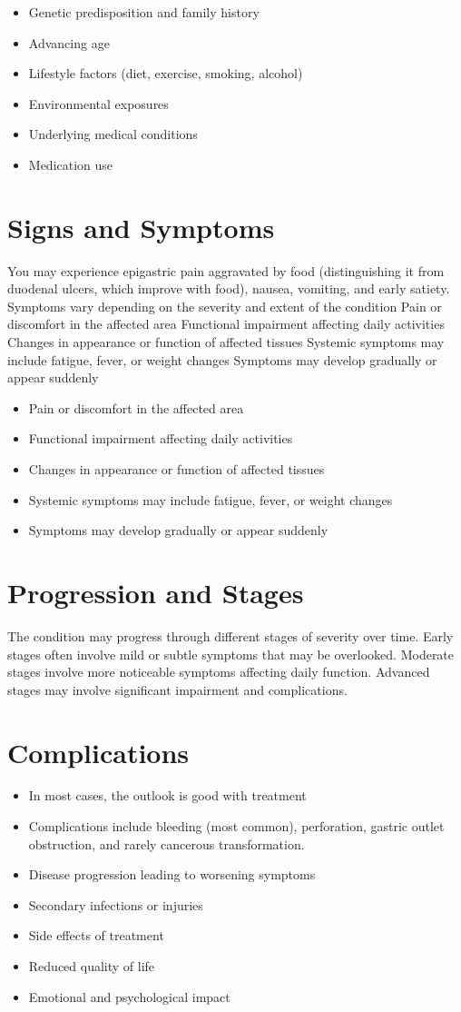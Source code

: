 \begin{itemize}[noitemsep]
  \item Genetic predisposition and family history
  \item Advancing age
  \item Lifestyle factors (diet, exercise, smoking, alcohol)
  \item Environmental exposures
  \item Underlying medical conditions
  \item Medication use
\end{itemize}
\section{Signs and Symptoms}
You may experience epigastric pain aggravated by food (distinguishing it from duodenal ulcers, which improve with food), nausea, vomiting, and early satiety. Symptoms vary depending on the severity and extent of the condition Pain or discomfort in the affected area Functional impairment affecting daily activities Changes in appearance or function of affected tissues Systemic symptoms may include fatigue, fever, or weight changes Symptoms may develop gradually or appear suddenly

\begin{itemize}[noitemsep]
  \item Pain or discomfort in the affected area
  \item Functional impairment affecting daily activities
  \item Changes in appearance or function of affected tissues
  \item Systemic symptoms may include fatigue, fever, or weight changes
  \item Symptoms may develop gradually or appear suddenly
\end{itemize}
\section{Progression and Stages}
The condition may progress through different stages of severity over time. Early stages often involve mild or subtle symptoms that may be overlooked. Moderate stages involve more noticeable symptoms affecting daily function. Advanced stages may involve significant impairment and complications.
\section{Complications}
\begin{itemize}[noitemsep]
  \item In most cases, the outlook is good with treatment
  \item Complications include bleeding (most common), perforation, gastric outlet obstruction, and rarely cancerous transformation.
  \item Disease progression leading to worsening symptoms
  \item Secondary infections or injuries
  \item Side effects of treatment
  \item Reduced quality of life
  \item Emotional and psychological impact
\end{itemize}
